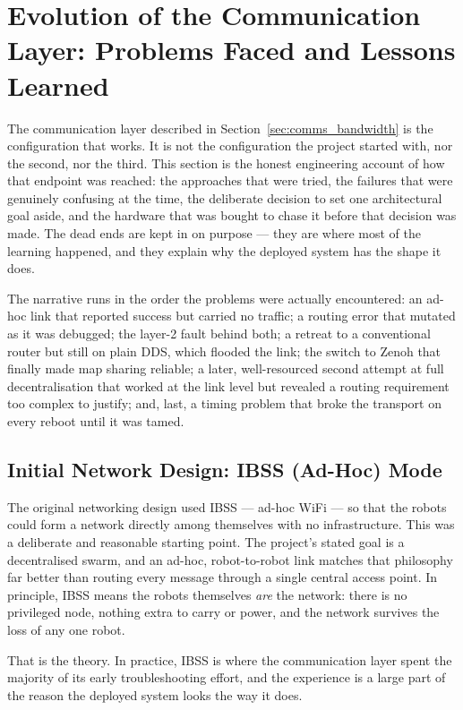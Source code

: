 \section{Evolution of the Communication Layer: Problems Faced and Lessons Learned}
\label{sec:comms_evolution}

The communication layer described in Section~\ref{sec:comms_bandwidth} is the configuration that works. It is not the configuration the project started with, nor the second, nor the third. This section is the honest engineering account of how that endpoint was reached: the approaches that were tried, the failures that were genuinely confusing at the time, the deliberate decision to set one architectural goal aside, and the hardware that was bought to chase it before that decision was made. The dead ends are kept in on purpose --- they are where most of the learning happened, and they explain why the deployed system has the shape it does.

The narrative runs in the order the problems were actually encountered: an ad-hoc link that reported success but carried no traffic; a routing error that mutated as it was debugged; the layer-2 fault behind both; a retreat to a conventional router but still on plain DDS, which flooded the link; the switch to Zenoh that finally made map sharing reliable; a later, well-resourced second attempt at full decentralisation that worked at the link level but revealed a routing requirement too complex to justify; and, last, a timing problem that broke the transport on every reboot until it was tamed.

\subsection{Initial Network Design: IBSS (Ad-Hoc) Mode}
\label{subsec:ibss}

The original networking design used IBSS --- ad-hoc WiFi --- so that the robots could form a network directly among themselves with no infrastructure. This was a deliberate and reasonable starting point. The project's stated goal is a decentralised swarm, and an ad-hoc, robot-to-robot link matches that philosophy far better than routing every message through a single central access point. In principle, IBSS means the robots themselves \emph{are} the network: there is no privileged node, nothing extra to carry or power, and the network survives the loss of any one robot.

That is the theory. In practice, IBSS is where the communication layer spent the majority of its early troubleshooting effort, and the experience is a large part of the reason the deployed system looks the way it does.

